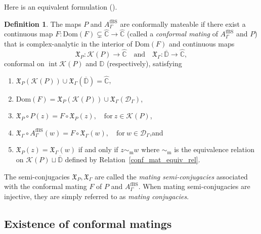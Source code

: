 \documentclass[JEP,XML,SOM,Unicode,NoFloatCountersInSection,published]{cedram}
\theoremstyle{definition}
\newtheorem{definition}[lemma]{Definition}
\theoremstyle{remark}
\newcommand{\C}{\mathbb{C}}
\newcommand{\D}{\mathbb{D}}
\DeclareMathOperator{\Int}{int}
\begin{document}
Here is an equivalent formulation (\cf \cite[Def.\,4.14]{petersen-meyer-mating}).
\begin{definition}\label{conf_mat_def}
The maps $P$ and $A_{\Gamma}^{\mathrm{fBS}}$ are conformally mateable if there exist a continuous map $F\colon \mathrm{Dom}(F)\subsetneq\widehat{\C}\to\widehat{\C}$ (called a \emph{conformal mating} of $A_{\Gamma}^{\mathrm{fBS}}$ and $P$) that is complex-analytic in the interior of $\mathrm{Dom}(F)$ and continuous maps\vspace*{-3pt}
\[
\mathfrak{X}_P:\mathcal{K}(P)\to\widehat{\C}\quad \text{and}\quad \mathfrak{X}_\Gamma: \overline{\D}\to\widehat{\C},
\]
conformal on $\Int{\mathcal{K}(P)}$ and $\D$ (respectively), satisfying
\begin{enumerate}
\item\label{topo_cond} $\mathfrak{X}_P\left(\mathcal{K}(P)\right)\cup \mathfrak{X}_\Gamma\left(\overline{\D}\right) = \widehat{\C}$,

\item\label{dom_cond} $\mathrm{Dom}(F)= \mathfrak{X}_P(\mathcal{K}(P))\cup\mathfrak{X}_\Gamma(\mathcal{D}_{\Gamma})$,

\item $\mathfrak{X}_P\circ P(z) = F\circ \mathfrak{X}_P(z),\quad \mathrm{for}\ z\in\mathcal{K}(P)$,

\item $\mathfrak{X}_\Gamma\circ A_{\Gamma}^{\mathrm{fBS}}(w) = F\circ \mathfrak{X}_\Gamma(w),\quad \mathrm{for}\ w\in
\mathcal{D}_{\Gamma}$,\quad and

\item\label{identifications} $\mathfrak{X}_P(z)=\mathfrak{X}_\Gamma(w)$ if and only if $z\sim_{\mathrm{m}} w$ where $\sim_{\mathrm{m}}$ is the equivalence relation on $\mathcal{K}(P)\sqcup \overline{\D}$ defined by Relation~\eqref{conf_mat_equiv_rel}.
\end{enumerate}
The semi-conjugacies $\mathfrak{X}_P, \mathfrak{X}_\Gamma$ are called the \emph{mating semi-conjugacies} associated with the conformal mating $F$ of $P$ and $A_{\Gamma}^{\mathrm{fBS}}$. When mating semi-conjugacies are injective, they are simply referred to as \emph{mating conjugacies}.
\end{definition}

\subsection{Existence of conformal matings}\label{conf_mat_exists_subsec}
\end{document}

